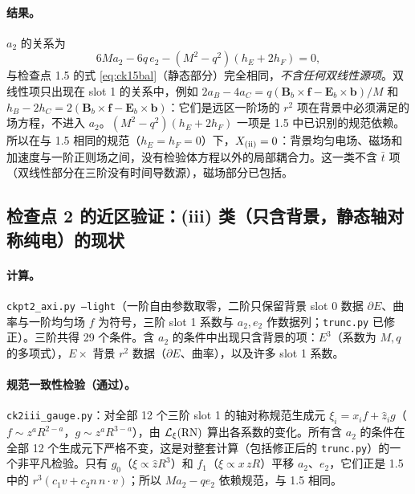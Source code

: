\documentclass[11pt,a4paper]{ctexart}
\numberwithin{equation}{section}
\begin{document}
\paragraph{结果。}$a_2$ 的关系为
\begin{equation*}
6Ma_2-6q\,e_2-(M^2-q^2)(h_E+2h_F)=0 ,
\end{equation*}
与检查点 1.5 的式 \eqref{eq:ck15bal}（静态部分）完全相同，\emph{不含任何双线性源项}。双线性项只出现在 slot 1 的关系中，例如 $2a_B-4a_C=q(\boldsymbol B_b\times\boldsymbol f-\boldsymbol E_b\times\boldsymbol b)/M$ 和 $h_B-2h_C=2(\boldsymbol B_b\times\boldsymbol f-\boldsymbol E_b\times\boldsymbol b)$：它们是远区一阶场的 $r^2$ 项在背景中必须满足的场方程，不进入 $a_2$。$(M^2-q^2)(h_E+2h_F)$ 一项是 1.5 中已识别的规范依赖。所以在与 1.5 相同的规范（$h_E=h_F=0$）下，$X_{\rm(ii)}=0$：背景均匀电场、磁场和加速度与一阶正则场之间，没有检验体方程以外的局部耦合力。这一类不含 $\bar t$ 项（双线性部分在三阶没有时间导数源），磁场部分已包括。

\subsection{检查点 2 的近区验证：(iii) 类（只含背景，静态轴对称纯电）的现状}
\label{sec:L6ck2iii}

\paragraph{计算。}\texttt{ckpt2\_axi.py --light}（一阶自由参数取零，二阶只保留背景 slot 0 数据 $\partial E$、曲率与一阶均匀场 $f$ 为符号，三阶 slot 1 系数与 $a_2,e_2$ 作数据列；\texttt{trunc.py} 已修正）。三阶共得 29 个条件。含 $a_2$ 的条件中出现只含背景的项：$E^3$（系数为 $M,q$ 的多项式），$E\times$ 背景 $r^2$ 数据（$\partial E$、曲率），以及许多 slot 1 系数。

\paragraph{规范一致性检验（通过）。}\texttt{ck2iii\_gauge.py}：对全部 12 个三阶 slot 1 的轴对称规范生成元 $\xi_i=x_if+\hat z_ig$（$f\sim z^aR^{2-a}$，$g\sim z^aR^{3-a}$），由 $\mathcal L_\xi({\rm RN})$ 算出各系数的变化。所有含 $a_2$ 的条件在全部 12 个生成元下严格不变，这是对整套计算（包括修正后的 \texttt{trunc.py}）的一个非平凡检验。只有 $g_0$（$\xi\propto\hat zR^3$）和 $f_1$（$\xi\propto x\,zR$）平移 $a_2$、$e_2$，它们正是 1.5 中的 $r^3(c_1v+c_2n\,n\cdot v)$；所以 $Ma_2-qe_2$ 依赖规范，与 1.5 相同。
\end{document}
